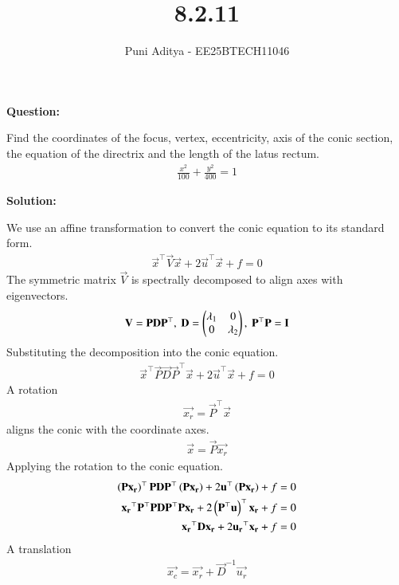 \documentclass[journal]{IEEEtran}
\begin{document}
\title{8.2.11}
\author{Puni Aditya - EE25BTECH11046}
\maketitle

\textbf{Question:}

Find the coordinates of the focus, vertex, eccentricity, axis of the conic section, the equation of the directrix and the length of the latus rectum.
\begin{align*}
    \frac{x^2}{100} + \frac{y^2}{400} = 1
\end{align*}

\textbf{Solution:}

We use an affine transformation to convert the conic equation to its standard form.
\begin{align*}
    \vec{x}^\top\vec{V}\vec{x} + 2\vec{u}^\top\vec{x} + f = 0
\end{align*}
The symmetric matrix $\vec{V}$ is spectrally decomposed to align axes with eigenvectors.
\begin{align}
    \mathbf{V} = \mathbf{P}\mathbf{D}\mathbf{P}^\top, \text{ } \mathbf{D} = \begin{pmatrix}\lambda_1 & 0 \\ 0 & \lambda_2\end{pmatrix}, \text{ } \mathbf{P}^\top\mathbf{P} = \mathbf{I}
\end{align}
Substituting the decomposition into the conic equation.
\begin{align}
    \vec{x}^\top\vec{P}\vec{D}\vec{P}^\top\vec{x} + 2\vec{u}^\top\vec{x} + f = 0
\end{align}
A rotation
\begin{align}
    \vec{x_r} = \vec{P}^\top\vec{x} 
\end{align}
aligns the conic with the coordinate axes.
\begin{align}
    \vec{x} = \vec{P}\vec{x_r}
\end{align}
Applying the rotation to the conic equation.
\begin{align}
    \left(\mathbf{P}\mathbf{x_r}\right)^\top\mathbf{P}\mathbf{D}\mathbf{P}^\top\left(\mathbf{P}\mathbf{x_r}\right) + 2\mathbf{u}^\top\left(\mathbf{P}\mathbf{x_r}\right) + f &= 0 \\
    \mathbf{x_r}^\top\mathbf{P}^\top\mathbf{P}\mathbf{D}\mathbf{P}^\top\mathbf{P}\mathbf{x_r} + 2\left(\mathbf{P}^\top\mathbf{u}\right)^\top\mathbf{x_r} + f &= 0 \\
    \mathbf{x_r}^\top\mathbf{D}\mathbf{x_r} + 2\mathbf{u_r}^\top\mathbf{x_r} + f &= 0
\end{align}
A translation 
\begin{align}
    \vec{x_c} = \vec{x_r} + \vec{D}^{-1}\vec{u_r}
\end{align}
\end{document}
